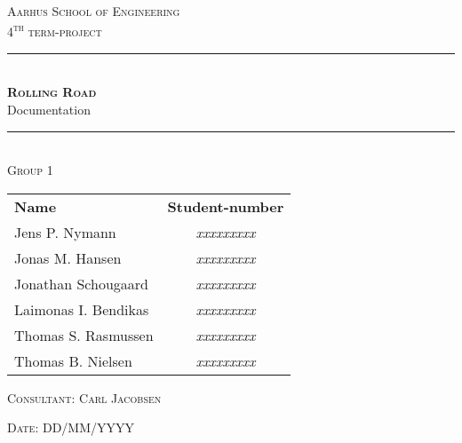 \newcommand{\HRule}{\rule{\linewidth}{0.1mm}} %

\begin{center}
	
	\textsc{\LARGE Aarhus School of Engineering}\\[1.5cm] %
	
	\textsc{\large 4\textsuperscript{th} term-project}\\[2.5cm] 
	\HRule \\[0.8cm]
	{\huge \bfseries \textsc{Rolling Road}} \\[0.5cm]{\LARGE Documentation} \\[0.4cm]
	\HRule \\[1.5cm]
	
	\textsc{\large Group 1}\\
	\vspace{0.5 in}
	\begin{center}
		\begin{tabular}{l c}
			\textbf{Name} & \textbf{Student-number} \\
			Jens P. Nymann & \textsl{xxxxxxxxx} \\
			Jonas M. Hansen & \textsl{xxxxxxxxx} \\
			Jonathan Schougaard & \textsl{xxxxxxxxx} \\
			Laimonas I. Bendikas & \textsl{xxxxxxxxx} \\
			Thomas S. Rasmussen & \textsl{xxxxxxxxx} \\
			Thomas B. Nielsen & \textsl{xxxxxxxxx} \\
		\end{tabular}
	\end{center}
	\vspace{0.5 in}
	
	\textsc{\large Consultant: Carl Jacobsen}
	\vspace{0.5 in}
	
	\textsc{\large Date: DD/MM/YYYY}\\
	
\end{center} %

\newpage
